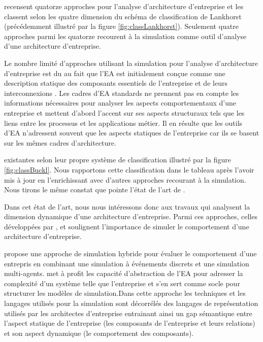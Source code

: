 \cite{manzur2015xarchimate} recensent quatorze approches pour l'analyse
d'architecture d'entreprise et les classent selon les quatre dimension du
schéma de classification de Lankhorst (précédemment illustré par la figure
\ref{fig:classLankhorst}). Seulement quatre approches parmi les quatorze
recourent à la simulation comme outil d'analyse d'une architecture
d'entreprise.

Le nombre limité d'approches utilisant la simulation pour l'analyse
d'architecture d'entreprise est du au fait que l'EA est initialement conçue
comme une description statique des composants essentiels de l'entreprise et de
leurs interconnexions \cite{hoffman2013enterprise}. Les cadres d'EA standards
ne prennent pas en compte les informations nécessaires pour analyser les
aspects comportementaux d'une entreprise et mettent d'abord l'accent sur ses
aspects structuraux tels que les liens entre les processus et les applications
métier.  Il en résulte que les outils d'EA n'adressent souvent que les aspects
statiques de l'entreprise car ils se basent sur les mêmes cadres
d'architecture.

existantes selon leur propre système de classification illustré par la figure
\ref{fig:classBuckl}. Nous rapportons cette classification dans le tableau
après l'avoir mis à jour en l'enrichissant avec d'autres approches recourant à
la simulation. Nous tirons le même constat que pointe l'état de l'art de
\cite{manzur2015xarchimate}. 

Dans cet état de l'art, nous nous intéressons donc aux travaux qui analysent la
dimension dynamique d'une architecture d'entreprise. Parmi ces approches,
celles développées par \cite{glazner2011enterprise},
\cite{ludwig2011organizational} et \cite{manzur2015xarchimate} soulignent
l'importance de simuler le comportement d'une architecture d'entreprise. 

\cite{glazner2011enterprise} propose une approche de simulation hybride pour
évaluer le comportement d'une entrepris en combinant une simulation à
événements discrets et une simulation multi-agents.
\cite{glazner2011enterprise} met à profit les capacité d'abstraction de l'EA
pour adresser la complexité d'un système telle que l'entreprise et s'en sert
comme socle pour structurer les modèles de simulation.Dans cette approche les
techniques et les langages utilisés pour la simulation sont décorrélés des
langages de représentation utilisés par les architectes d'entreprise entrainant
ainsi un gap sémantique entre l'aspect statique de l'entreprise (les composants
de l'entreprise et leurs relations) et son aspect dynamique (le comportement
des composants). 


